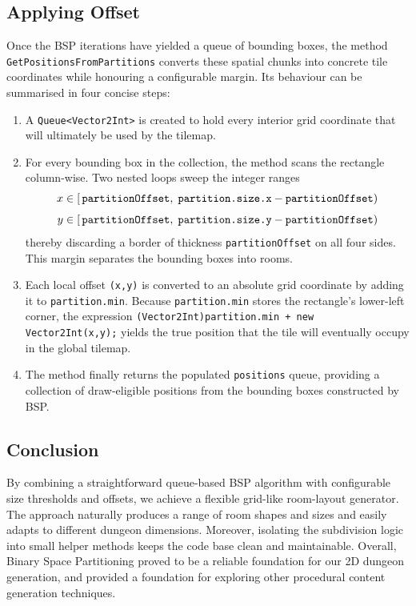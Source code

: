 \documentclass[a4paper, 12pt, one column, aas_macros]{article}
\begin{document}
\subsection{Applying Offset}
Once the BSP iterations have yielded a queue of bounding boxes, the method \\ \texttt{GetPositionsFromPartitions} converts these spatial chunks into concrete tile coordinates while honouring a configurable margin. Its behaviour can be summarised in four concise steps:
\begin{enumerate}
  \item A \texttt{Queue<Vector2Int>} is created to hold every interior grid coordinate that will ultimately be used by the tilemap.
  \item For every bounding box in the collection, the method scans the rectangle column-wise. Two nested loops sweep the integer ranges 
\[
\begin{aligned}
  x &\in [\,\text{\texttt{partitionOffset}},\;
           \text{\texttt{partition.size.x}}
           - \text{\texttt{partitionOffset}}) \\[4pt]
  y &\in [\,\text{\texttt{partitionOffset}},\;
           \text{\texttt{partition.size.y}}
           - \text{\texttt{partitionOffset}})
\end{aligned}
\]
thereby discarding a border of thickness \texttt{partitionOffset} on all four sides. This margin separates the bounding boxes into rooms.
  \item Each local offset \texttt{(x,y)} is converted to an absolute grid coordinate by adding it to \texttt{partition.min}. Because \texttt{partition.min} stores the rectangle's lower-left corner, the expression \texttt{(Vector2Int)partition.min + new Vector2Int(x,y);} yields the true position that the tile will eventually occupy in the global tilemap.
  \item The method finally returns the populated \texttt{positions} queue, providing a collection of draw-eligible positions from the bounding boxes constructed by BSP.
\end{enumerate}

\subsection{Conclusion}
By combining a straightforward queue-based BSP algorithm with configurable size thresholds and offsets, we achieve a flexible grid-like room-layout generator. The approach naturally produces a range of room shapes and sizes and easily adapts to different dungeon dimensions. Moreover, isolating the subdivision logic into small helper methods keeps the code base clean and maintainable. Overall, Binary Space Partitioning proved to be a reliable foundation for our 2D dungeon generation, and provided a foundation for exploring other procedural content generation techniques.
\end{document}
